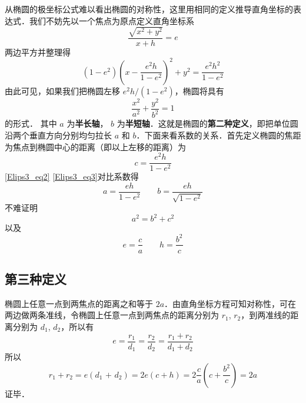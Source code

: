 

从椭圆的极坐标公式难以看出椭圆的对称性，这里用相同的定义推导直角坐标的表达式．我们不妨先以一个焦点为原点定义直角坐标系
\begin{equation}
\frac{{\sqrt {{x^2} + {y^2}} }}{{x + h}} = e
\end{equation}
两边平方并整理得
\begin{equation}\label{Elips3_eq2}
(1 - {e^2}){\left( {x - \frac{{{e^2}h}}{{1 - {e^2}}}} \right)^2} + {y^2} = \frac{{{e^2}{h^2}}}{{1 - {e^2}}}
\end{equation}
由此可见，如果我们把椭圆左移 ${e^2}h/(1 - {e^2})$，椭圆将具有
\begin{equation}\label{Elips3_eq3}
\frac{{{x^2}}}{{{a^2}}} + \frac{{{y^2}}}{{{b^2}}} = 1
\end{equation}
的形式． 其中 $a$ 为\textbf{半长轴}， $b$ 为\textbf{半短轴}．这就是椭圆的\textbf{第二种定义}，即把单位圆沿两个垂直方向分别均匀拉长 $a$ 和 $b$．下面来看系数的关系．首先定义椭圆的焦距为焦点到椭圆中心的距离（即以上左移的距离）为
\begin{equation}
c = \frac{{{e^2}h}}{{1 - {e^2}}}
\end{equation}
\autoref{Elips3_eq2} \autoref{Elips3_eq3}对比系数得
\begin{equation}
a = \frac{{eh}}{{1 - {e^2}}} \qquad b = \frac{{eh}}{{\sqrt {1 - {e^2}} }}
\end{equation}
不难证明
\begin{equation}
{a^2} = {b^2} + {c^2}
\end{equation}
以及
\begin{equation}
e = \frac{c}{a} \qquad h = \frac{{{b^2}}}{c}
\end{equation}

\subsection{第三种定义}
椭圆上任意一点到两焦点的距离之和等于 $2a$．由直角坐标方程可知对称性，可在两边做两条准线，令椭圆上任意一点到两焦点的距离分别为 $r_1$, $r_2$，到两准线的距离分别为 $d_1$, $d_2$，所以有
\begin{equation}
e = \frac{{{r_1}}}{{{d_1}}} = \frac{{{r_2}}}{{{d_2}}} = \frac{{{r_1} + {r_2}}}{{{d_1} + {d_2}}}
\end{equation}
所以
\begin{equation}
{r_1} + {r_2} = e({d_1}{\text{ + }}{d_2}) = 2e(c + h) = 2\frac{c}{a}\left( {c + \frac{{{b^2}}}{c}} \right) = 2a
\end{equation}
证毕．
